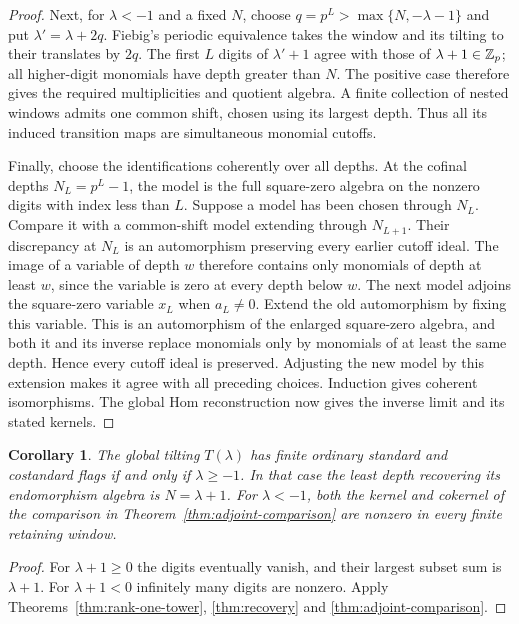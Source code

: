 \documentclass[11pt,reqno]{amsart}
\newtheorem{corollary}[theorem]{Corollary}
\theoremstyle{definition}
\theoremstyle{remark}
\numberwithin{equation}{section}
\begin{document}
\begin{proof}
Next, for $\lambda<-1$ and a fixed $N$, choose $q=p^L>\max\{N,-\lambda-1\}$
and put $\lambda'=\lambda+2q$. Fiebig's periodic equivalence
\cite[Theorem~25]{Fiebig} takes the window and its tilting to their
translates by $2q$. The first $L$ digits of $\lambda'+1$ agree with
those of $\lambda+1\in\mathbb Z_p$; all higher-digit monomials have depth
greater than $N$. The positive case therefore gives the required
multiplicities and quotient algebra. A finite collection of nested
windows admits one common shift, chosen using its largest depth.
Thus all its induced transition maps are
simultaneous monomial cutoffs.

Finally, choose the identifications coherently over all depths.
At the cofinal depths $N_L=p^L-1$, the model is the full square-zero
algebra on the nonzero digits with index less than $L$. Suppose a
model has been chosen through $N_L$. Compare it with a common-shift
model extending through $N_{L+1}$. Their discrepancy at $N_L$ is an
automorphism preserving every earlier cutoff ideal. The image of a
variable of depth $w$ therefore contains only monomials of depth
at least $w$, since the variable is zero at every depth below $w$.
The next model adjoins the square-zero variable $x_L$ when $a_L\ne0$.
Extend the old automorphism by fixing this variable. This is an
automorphism of the enlarged square-zero algebra, and both it and
its inverse replace monomials only by monomials of at least the same
depth. Hence every cutoff ideal is preserved. Adjusting the new
model by this extension makes it agree with all preceding choices.
Induction gives
coherent isomorphisms. The global Hom reconstruction now gives the
inverse limit and its stated kernels.
\end{proof}

\begin{corollary}\label{cor:rank-one-finite}
The global tilting $T(\lambda)$ has finite ordinary standard and
costandard flags if and only if $\lambda\geq-1$. In that case the
least depth recovering its endomorphism algebra is $N=\lambda+1$.
For $\lambda<-1$, both the kernel and cokernel of the comparison in
Theorem~\ref{thm:adjoint-comparison} are nonzero in every finite
retaining window.
\end{corollary}
\begin{proof}
For $\lambda+1\geq0$ the digits eventually vanish, and their largest
subset sum is $\lambda+1$. For $\lambda+1<0$ infinitely many digits
are nonzero. Apply Theorems~\ref{thm:rank-one-tower},
\ref{thm:recovery} and \ref{thm:adjoint-comparison}.
\end{proof}
\end{document}
